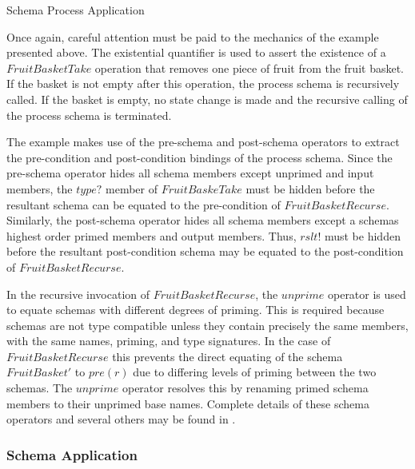 \documentclass[letterpaper,10pt,draft]{book}
\begin{document}
\begin{example}
\begin{minipage}[t]{0.51\linewidth}
   
\end{minipage}
\begin{minipage}[t]{0.48\linewidth}
   \azsch
   
\end{minipage}

   \caption{Schema Process Application}
   \label{ex:SchExpr}
\end{example}

Once again, careful attention must be paid to the mechanics of the example presented
above.  The existential quantifier is used to assert the existence of a $FruitBasketTake$
operation that removes one piece of fruit from the fruit basket.  If the basket
is not empty after this operation, the process schema is recursively called.  If
the basket is empty, no state change is made and the recursive calling of the process
schema is terminated.

The example makes use of the pre-schema and post-schema operators to extract the
pre-condition and post-condition bindings of the process schema.  Since the pre-schema
operator hides all schema members except unprimed and input members, the $type?$
member of $FruitBaskeTake$ must be hidden before the resultant schema can be equated
to the pre-condition of $FruitBasketRecurse$.  Similarly, the post-schema operator
hides all schema members except a schemas highest order primed members and output
members.  Thus, $rslt!$ must be hidden before the resultant post-condition schema
may be equated to the post-condition of $FruitBasketRecurse$.

In the recursive invocation of $FruitBasketRecurse$, the $unprime$ operator is used
to equate schemas with different degrees of priming.  This is required because schemas
are not type compatible unless they contain precisely the same members, with the
same names, priming, and type signatures.  In the case of $FruitBasketRecurse$ this
prevents the direct equating of the schema $FruitBasket'$ to $pre(r)$ due to differing
levels of priming between the two schemas.  The $unprime$ operator resolves this
by renaming primed schema members to their unprimed base names.  Complete details
of these schema operators and several others may be found in .

\subsubsection{Schema Application}
   \label{sect:SchAppl}
\end{document}
